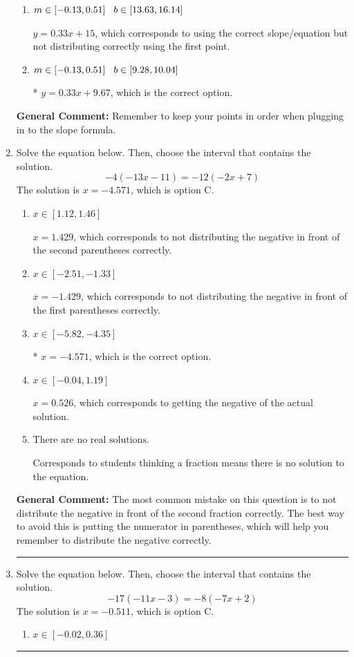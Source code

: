 \documentclass{extbook}[14pt]
\newcommand{\litem}[1]{\item #1

\rule{\textwidth}{0.4pt}}
\begin{document}
\begin{enumerate}
{\begin{enumerate}[label=\Alph*.]
 $y = 0.33x -9.67$, which corresponds to using the correct slope and getting the negative y-intercept.
\item \( m \in [-0.13, 0.51] \hspace*{3mm} b \in [13.63, 16.14] \)

 $y = 0.33x + 15$, which corresponds to using the correct slope/equation but not distributing correctly using the first point.
\item \( m \in [-0.13, 0.51] \hspace*{3mm} b \in [9.28, 10.04] \)

* $y = 0.33x + 9.67$, which is the correct option.
\end{enumerate}

\textbf{General Comment:} Remember to keep your points in order when plugging in to the slope formula.
}
\litem{
Solve the equation below. Then, choose the interval that contains the solution.
\[ -4(-13x -11) = -12(-2x + 7) \]
The solution is \( x = -4.571 \), which is option C.\begin{enumerate}[label=\Alph*.]
\item \( x \in [1.12, 1.46] \)

$x = 1.429$, which corresponds to not distributing the negative in front of the second parentheses correctly.
\item \( x \in [-2.51, -1.33] \)

$x = -1.429$, which corresponds to not distributing the negative in front of the first parentheses correctly.
\item \( x \in [-5.82, -4.35] \)

* $x = -4.571$, which is the correct option.
\item \( x \in [-0.04, 1.19] \)

$x = 0.526$, which corresponds to getting the negative of the actual solution.
\item \( \text{There are no real solutions.} \)

Corresponds to students thinking a fraction means there is no solution to the equation.
\end{enumerate}

\textbf{General Comment:} The most common mistake on this question is to not distribute the negative in front of the second fraction correctly. The best way to avoid this is putting the numerator in parentheses, which will help you remember to distribute the negative correctly.
}
\litem{
Solve the equation below. Then, choose the interval that contains the solution.
\[ -17(-11x -3) = -8(-7x + 2) \]
The solution is \( x = -0.511 \), which is option C.\begin{enumerate}[label=\Alph*.]
\item \( x \in [-0.02, 0.36] \)


\end{enumerate}}
\end{enumerate}
\end{document}
